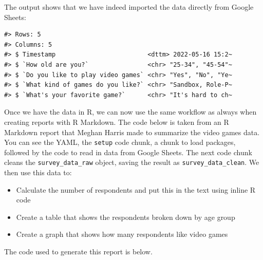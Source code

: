 \documentclass[
]{book}
\providecommand{\tightlist}{%
  \setlength{\itemsep}{0pt}\setlength{\parskip}{0pt}}
\begin{document}
The output shows that we have indeed imported the data directly from Google Sheets:

\begin{verbatim}
#> Rows: 5
#> Columns: 5
#> $ Timestamp                         <dttm> 2022-05-16 15:2~
#> $ `How old are you?`                <chr> "25-34", "45-54"~
#> $ `Do you like to play video games` <chr> "Yes", "No", "Ye~
#> $ `What kind of games do you like?` <chr> "Sandbox, Role-P~
#> $ `What's your favorite game?`      <chr> "It's hard to ch~
\end{verbatim}

Once we have the data in R, we can now use the same workflow as always when creating reports with R Markdown. The code below is taken from an R Markdown report that Meghan Harris made to summarize the video games data. You can see the YAML, the \texttt{setup} code chunk, a chunk to load packages, followed by the code to read in data from Google Sheets. The next code chunk cleans the \texttt{survey\_data\_raw} object, saving the result as \texttt{survey\_data\_clean}. We then use this data to:

\begin{itemize}
\tightlist
\item
  Calculate the number of respondents and put this in the text using inline R code
\item
  Create a table that shows the respondents broken down by age group
\item
  Create a graph that shows how many respondents like video games
\end{itemize}

The code used to generate this report is below.
\end{document}
